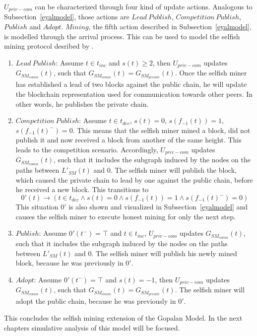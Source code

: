 $U_{priv-com}$ can be characterized through four kind of update actions. Analogous to Subsection~\ref{eyalmodel}, those actions are $Lead~Publish$, $Competition~Publish$, $Publish$ and $Adopt$. $Mining$, the fifth action described in Subsection~\ref{eyalmodel}, is modelled through the arrival process.
This can be used to model the selfish mining protocol desribed by \citeauthor{eyal}.
\begin{enumerate}
\item $Lead~Publish$: Assume $t \in t_{inc}$ and $s(t) \geq 2$, then $U_{priv-com}$ updates $G_{SM_{comm}}(t)$, such that $G_{SM_{comm}}(t) = G_{SM_{private}}(t)$. Once the selfish miner has established a lead of two blocks against the public chain, he will update the blockchain representation used for communication towards other peers. In other words, he publishes the private chain.
\item $Competition~Publish$: Assume $t \in t_{dec}$, $s(t) = 0$, $s(f_{-1}(t)) = 1$, $s(f_{-1}(t)^-) = 0$. This means that the selfish miner mined a block, did not publish it and now received a block from another of the same height. This leads to the competition scenario. Accordingly, $U_{priv-com}$ updates $G_{SM_{comm}}(t)$, such that it includes the subgraph induced by the nodes on the paths between $L'_{SM}(t)$ and ${0}$. The selfish miner will publish the block, which caused the private chain to lead by one against the public chain, before he received a new block. This transitions to 
\begin{equation}
0'(t) \rightarrow \left( t \in t_{dec} \wedge s(t) = 0 \wedge s(f_{-1}(t)) = 1 \wedge s(f_{-1}(t)^-) = 0\right)
\end{equation}
This situation $0'$ is also shown and visualized in Subsection~\ref{eyalmodel} and causes the selfish miner to execute honest mining for only the next step.
\item $Publish$: Assume $0'(t^-)=\top$ and $t \in t_{inc}$, $U_{priv-com}$ updates $G_{SM_{comm}}(t)$, such that it includes the subgraph induced by the nodes on the paths between $L'_{SM}(t)$ and ${0}$. The selfish miner will publish his newly mined block, because he was previously in $0'$.
\item $Adopt$: Assume $0'(t^-)=\top$ and $s(t)=-1$, then $U_{priv-com}$ updates $G_{SM_{comm}}(t)$, such that $G_{SM_{comm}}(t) = G_{SM_{private}}(t)$. The selfish miner will adopt the public chain, because he was previously in $0'$.
\end{enumerate}
This concludes the selfish mining extension of the Gopalan Model. In the next chapters simulative analysis of this model will be focused. 








